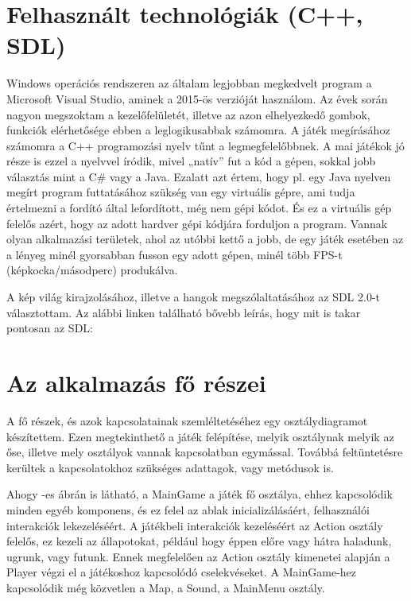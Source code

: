 \label{Chap:komponensek}

\section{Felhasznált technológiák (C++, SDL)}

Windows operációs rendszeren az általam legjobban megkedvelt program a Microsoft Visual Studio, aminek a 2015-ös verzióját használom. Az évek során nagyon megszoktam a kezelőfelületét, illetve az azon elhelyezkedő gombok, funkciók elérhetősége ebben a leglogikusabbak számomra. A játék megírásához számomra a C++ programozási nyelv tűnt a legmegfelelőbbnek. A mai játékok jó része is ezzel a nyelvvel íródik, mivel „natív” fut a kód a gépen, sokkal jobb választás mint a C\# vagy a Java. Ezalatt azt értem, hogy pl. egy Java nyelven megírt program futtatásához szükség van egy virtuális gépre, ami tudja értelmezni a fordító által lefordított, még nem gépi kódot. És ez a virtuális gép felelős azért, hogy az adott hardver gépi kódjára forduljon a program. Vannak olyan alkalmazási területek, ahol az utóbbi kettő a jobb, de egy játék esetében az a lényeg minél gyorsabban fusson egy adott gépen, minél több FPS-t (képkocka/másodperc) produkálva.

A kép világ kirajzolásához, illetve a hangok megszólaltatásához az SDL 2.0-t választottam. Az alábbi linken található bővebb leírás, hogy mit is takar pontosan az SDL:


\section{Az alkalmazás fő részei}

A fő részek, és azok kapcsolatainak szemléltetéséhez egy osztálydiagramot készítettem. Ezen megtekinthető a játék felépítése, melyik osztálynak melyik az őse, illetve mely osztályok vannak kapcsolatban egymással. Továbbá feltüntetésre kerültek a kapcsolatokhoz szükséges adattagok, vagy metódusok is.

Ahogy -es ábrán is látható, a MainGame a játék fő osztálya, ehhez kapcsolódik minden egyéb komponens, és ez felel az ablak inicializálásáért, felhasználói interakciók lekezeléséért. A játékbeli interakciók kezeléséért az Action osztály felelős, ez kezeli az állapotokat, például hogy éppen előre vagy hátra haladunk, ugrunk, vagy futunk. Ennek megfelelően az Action osztály kimenetei alapján a Player végzi el a játékoshoz kapcsolódó cselekvéseket. A MainGame-hez kapcsolódik még közvetlen a Map, a Sound, a MainMenu osztály. 

